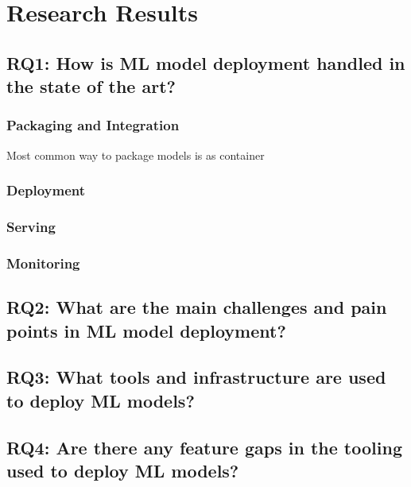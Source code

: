 \chapter{Research Results}
\section{RQ1: How is ML model deployment handled in the state of the art?}
\subsection{Packaging and Integration}
Most common way to package models is as container \cite{Garcia2020, Li2017, Ruf2021, Crankshaw2017}
\subsection{Deployment}
\subsection{Serving}
\subsection{Monitoring}
\section{RQ2: What are the main challenges and pain points in ML model deployment?}
\section{RQ3: What tools and infrastructure are used to deploy ML models?}
\section{RQ4: Are there any feature gaps in the tooling used to deploy ML models?}